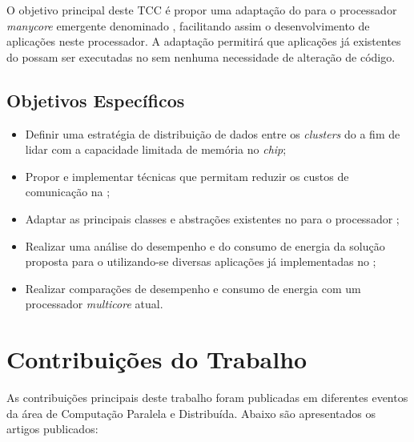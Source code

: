 O objetivo principal deste TCC é propor uma adaptação do \fw \pskel para o processador \textit{manycore}
emergente denominado \mppa, facilitando assim o desenvolvimento de aplicações \stencil neste processador.
A adaptação permitirá que aplicações já existentes do \pskel possam ser executadas
no \mppa sem nenhuma necessidade de alteração de código.

\subsection{Objetivos Específicos}

\begin{itemize}
	\item Definir uma estratégia de distribuição de dados entre os \textit{clusters} do \mppa a fim de
	lidar com a capacidade limitada de memória no \textit{chip};
	\item Propor e implementar técnicas que permitam reduzir os custos de comunicação na \noc;
	\item Adaptar as principais classes e abstrações existentes no \pskel para o processador \mppa;
	\item Realizar uma análise do desempenho e do consumo de energia da solução proposta para o \mppa
	utilizando-se diversas aplicações \stencil já implementadas no \pskel;
	\item Realizar comparações de desempenho e consumo de energia com um processador \textit{multicore} atual.
\end{itemize}

\section{Contribuições do Trabalho}

As contribuições principais deste trabalho foram publicadas em diferentes eventos da área de Computação Paralela e Distribuída.
Abaixo são apresentados os artigos publicados:

